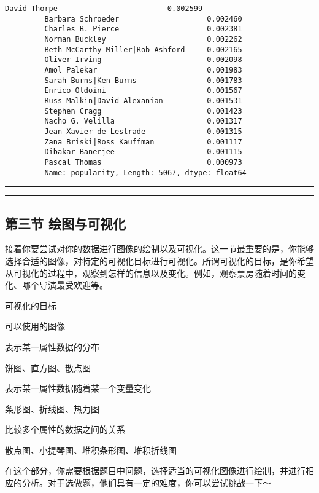 \documentclass[11pt]{article}
\begin{document}
\begin{Verbatim}[commandchars=\\\{\}]
         David Thorpe                         0.002599
         Barbara Schroeder                    0.002460
         Charles B. Pierce                    0.002381
         Norman Buckley                       0.002262
         Beth McCarthy-Miller|Rob Ashford     0.002165
         Oliver Irving                        0.002098
         Amol Palekar                         0.001983
         Sarah Burns|Ken Burns                0.001783
         Enrico Oldoini                       0.001567
         Russ Malkin|David Alexanian          0.001531
         Stephen Cragg                        0.001423
         Nacho G. Velilla                     0.001317
         Jean-Xavier de Lestrade              0.001315
         Zana Briski|Ross Kauffman            0.001117
         Dibakar Banerjee                     0.001115
         Pascal Thomas                        0.000973
         Name: popularity, Length: 5067, dtype: float64
\end{Verbatim}
            
    \begin{center}\rule{0.5\linewidth}{\linethickness}\end{center}

\begin{center}\rule{0.5\linewidth}{\linethickness}\end{center}

\subsection{第三节
绘图与可视化}\label{ux7b2cux4e09ux8282-ux7ed8ux56feux4e0eux53efux89c6ux5316}

接着你要尝试对你的数据进行图像的绘制以及可视化。这一节最重要的是，你能够选择合适的图像，对特定的可视化目标进行可视化。所谓可视化的目标，是你希望从可视化的过程中，观察到怎样的信息以及变化。例如，观察票房随着时间的变化、哪个导演最受欢迎等。

可视化的目标

可以使用的图像

表示某一属性数据的分布

饼图、直方图、散点图

表示某一属性数据随着某一个变量变化

条形图、折线图、热力图

比较多个属性的数据之间的关系

散点图、小提琴图、堆积条形图、堆积折线图

在这个部分，你需要根据题目中问题，选择适当的可视化图像进行绘制，并进行相应的分析。对于选做题，他们具有一定的难度，你可以尝试挑战一下～
\end{document}

